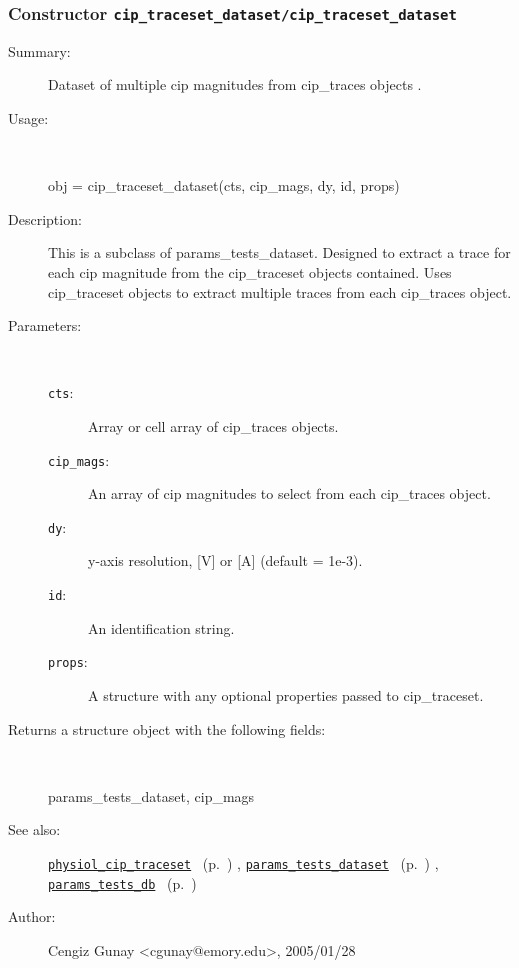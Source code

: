 \subsubsection[Constructor \texttt{cip\_traceset\_dataset}]{Constructor \texttt{cip\_traceset\_dataset/cip\_traceset\_dataset}}%
%
\label{ref_cip_traceset_dataset__cip_traceset_dataset}%
\hypertarget{ref_cip_traceset_dataset__cip_traceset_dataset}{}%
\begin{description}
\item[Summary:]Dataset of multiple cip magnitudes from cip\_traces objects .
%
\item[Usage:]~%
\begin{lyxcode}%
obj = cip\_traceset\_dataset(cts, cip\_mags, dy, id, props)
%
\end{lyxcode}%
%
\item[Description:]%
This is a subclass of params\_tests\_dataset. Designed to extract a trace
 for each cip magnitude from the cip\_traceset objects contained. Uses cip\_traceset
 objects to extract multiple traces from each cip\_traces object.
\item[Parameters:]~
\begin{description}%
\item[\texttt{cts}:]
 Array or cell array of cip\_traces objects.
\item[\texttt{cip\_mags}:]
 An array of cip magnitudes to select from each cip\_traces object.
\item[\texttt{dy}:]
 y-axis resolution, [V] or [A] (default = 1e-3).
\item[\texttt{id}:]
 An identification string.
\item[\texttt{props}:]
 A structure with any optional properties passed to cip\_traceset.
\end{description}%
%
\item[Returns a structure object with the following fields:]~

	params\_tests\_dataset, cip\_mags
%
%
\item[See also:]%
\hyperlink{ref_physiol_cip_traceset}{\texttt{physiol\_cip\_traceset}}%
\ (p.~\pageref{ref_physiol_cip_traceset})%
%
, \hyperlink{ref_params_tests_dataset}{\texttt{params\_tests\_dataset}}%
\ (p.~\pageref{ref_params_tests_dataset})%
%
, \hyperlink{ref_params_tests_db}{\texttt{params\_tests\_db}}%
\ (p.~\pageref{ref_params_tests_db})%
%
%
\item[Author:]%
Cengiz Gunay <cgunay@emory.edu>, 2005/01/28%
\end{description}
\methodline%
